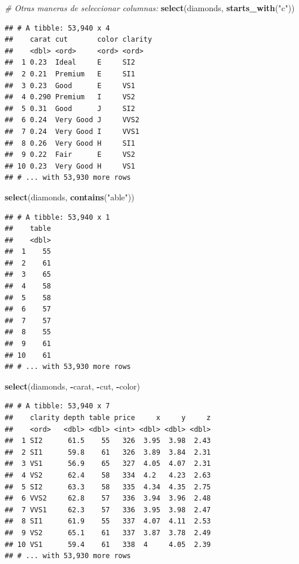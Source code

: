 \documentclass[]{book}
\newenvironment{Shaded}{\begin{snugshade}}{\end{snugshade}}
\newcommand{\KeywordTok}[1]{\textcolor[rgb]{0.13,0.29,0.53}{\textbf{#1}}}
\newcommand{\StringTok}[1]{\textcolor[rgb]{0.31,0.60,0.02}{#1}}
\newcommand{\CommentTok}[1]{\textcolor[rgb]{0.56,0.35,0.01}{\textit{#1}}}
\newcommand{\OperatorTok}[1]{\textcolor[rgb]{0.81,0.36,0.00}{\textbf{#1}}}
\newcommand{\NormalTok}[1]{#1}
\theoremstyle{definition}
\theoremstyle{definition}
\theoremstyle{definition}
\theoremstyle{remark}
\begin{document}
\begin{Shaded}
\begin{Highlighting}[]
\CommentTok{# Otras maneras de seleccionar columnas:}
\KeywordTok{select}\NormalTok{(diamonds, }\KeywordTok{starts_with}\NormalTok{(}\StringTok{"c"}\NormalTok{))}
\end{Highlighting}
\end{Shaded}

\begin{verbatim}
## # A tibble: 53,940 x 4
##    carat cut       color clarity
##    <dbl> <ord>     <ord> <ord>  
##  1 0.23  Ideal     E     SI2    
##  2 0.21  Premium   E     SI1    
##  3 0.23  Good      E     VS1    
##  4 0.290 Premium   I     VS2    
##  5 0.31  Good      J     SI2    
##  6 0.24  Very Good J     VVS2   
##  7 0.24  Very Good I     VVS1   
##  8 0.26  Very Good H     SI1    
##  9 0.22  Fair      E     VS2    
## 10 0.23  Very Good H     VS1    
## # ... with 53,930 more rows
\end{verbatim}

\begin{Shaded}
\begin{Highlighting}[]
\KeywordTok{select}\NormalTok{(diamonds, }\KeywordTok{contains}\NormalTok{(}\StringTok{"able"}\NormalTok{))}
\end{Highlighting}
\end{Shaded}

\begin{verbatim}
## # A tibble: 53,940 x 1
##    table
##    <dbl>
##  1    55
##  2    61
##  3    65
##  4    58
##  5    58
##  6    57
##  7    57
##  8    55
##  9    61
## 10    61
## # ... with 53,930 more rows
\end{verbatim}

\begin{Shaded}
\begin{Highlighting}[]
\KeywordTok{select}\NormalTok{(diamonds, }\OperatorTok{-}\NormalTok{carat, }\OperatorTok{-}\NormalTok{cut, }\OperatorTok{-}\NormalTok{color)}
\end{Highlighting}
\end{Shaded}

\begin{verbatim}
## # A tibble: 53,940 x 7
##    clarity depth table price     x     y     z
##    <ord>   <dbl> <dbl> <int> <dbl> <dbl> <dbl>
##  1 SI2      61.5    55   326  3.95  3.98  2.43
##  2 SI1      59.8    61   326  3.89  3.84  2.31
##  3 VS1      56.9    65   327  4.05  4.07  2.31
##  4 VS2      62.4    58   334  4.2   4.23  2.63
##  5 SI2      63.3    58   335  4.34  4.35  2.75
##  6 VVS2     62.8    57   336  3.94  3.96  2.48
##  7 VVS1     62.3    57   336  3.95  3.98  2.47
##  8 SI1      61.9    55   337  4.07  4.11  2.53
##  9 VS2      65.1    61   337  3.87  3.78  2.49
## 10 VS1      59.4    61   338  4     4.05  2.39
## # ... with 53,930 more rows
\end{verbatim}
\end{document}
